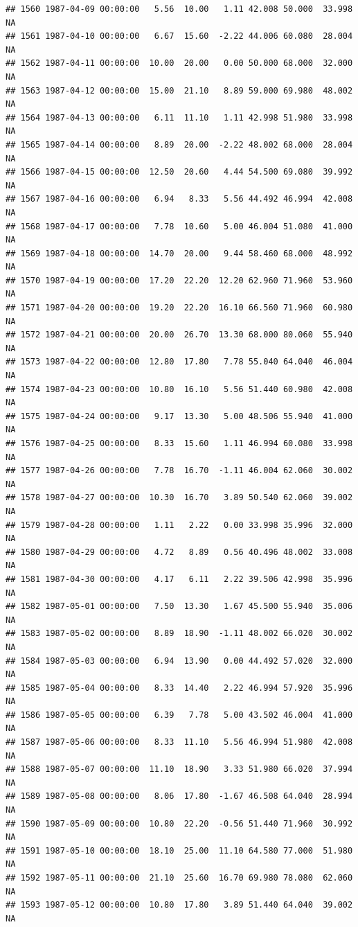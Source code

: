 \documentclass{article}\usepackage{graphicx, color}
\makeatletter
\newenvironment{kframe}{%
 \def\at@end@of@kframe{}%
 \ifinner\ifhmode%
  \def\at@end@of@kframe{\end{minipage}}%
  \begin{minipage}{\columnwidth}%
 \fi\fi%
 \def\FrameCommand##1{\hskip\@totalleftmargin \hskip-\fboxsep
 \colorbox{shadecolor}{##1}\hskip-\fboxsep
     \hskip-\linewidth \hskip-\@totalleftmargin \hskip\columnwidth}%
 \MakeFramed {\advance\hsize-\width
   \@totalleftmargin\z@ \linewidth\hsize
   \@setminipage}}%
 {\par\unskip\endMakeFramed%
 \at@end@of@kframe}
\newenvironment{knitrout}{}{} %
\makeatother
\begin{document}
\begin{knitrout}
\begin{kframe}
\begin{verbatim}
## 1560 1987-04-09 00:00:00   5.56  10.00   1.11 42.008 50.000  33.998     NA
## 1561 1987-04-10 00:00:00   6.67  15.60  -2.22 44.006 60.080  28.004     NA
## 1562 1987-04-11 00:00:00  10.00  20.00   0.00 50.000 68.000  32.000     NA
## 1563 1987-04-12 00:00:00  15.00  21.10   8.89 59.000 69.980  48.002     NA
## 1564 1987-04-13 00:00:00   6.11  11.10   1.11 42.998 51.980  33.998     NA
## 1565 1987-04-14 00:00:00   8.89  20.00  -2.22 48.002 68.000  28.004     NA
## 1566 1987-04-15 00:00:00  12.50  20.60   4.44 54.500 69.080  39.992     NA
## 1567 1987-04-16 00:00:00   6.94   8.33   5.56 44.492 46.994  42.008     NA
## 1568 1987-04-17 00:00:00   7.78  10.60   5.00 46.004 51.080  41.000     NA
## 1569 1987-04-18 00:00:00  14.70  20.00   9.44 58.460 68.000  48.992     NA
## 1570 1987-04-19 00:00:00  17.20  22.20  12.20 62.960 71.960  53.960     NA
## 1571 1987-04-20 00:00:00  19.20  22.20  16.10 66.560 71.960  60.980     NA
## 1572 1987-04-21 00:00:00  20.00  26.70  13.30 68.000 80.060  55.940     NA
## 1573 1987-04-22 00:00:00  12.80  17.80   7.78 55.040 64.040  46.004     NA
## 1574 1987-04-23 00:00:00  10.80  16.10   5.56 51.440 60.980  42.008     NA
## 1575 1987-04-24 00:00:00   9.17  13.30   5.00 48.506 55.940  41.000     NA
## 1576 1987-04-25 00:00:00   8.33  15.60   1.11 46.994 60.080  33.998     NA
## 1577 1987-04-26 00:00:00   7.78  16.70  -1.11 46.004 62.060  30.002     NA
## 1578 1987-04-27 00:00:00  10.30  16.70   3.89 50.540 62.060  39.002     NA
## 1579 1987-04-28 00:00:00   1.11   2.22   0.00 33.998 35.996  32.000     NA
## 1580 1987-04-29 00:00:00   4.72   8.89   0.56 40.496 48.002  33.008     NA
## 1581 1987-04-30 00:00:00   4.17   6.11   2.22 39.506 42.998  35.996     NA
## 1582 1987-05-01 00:00:00   7.50  13.30   1.67 45.500 55.940  35.006     NA
## 1583 1987-05-02 00:00:00   8.89  18.90  -1.11 48.002 66.020  30.002     NA
## 1584 1987-05-03 00:00:00   6.94  13.90   0.00 44.492 57.020  32.000     NA
## 1585 1987-05-04 00:00:00   8.33  14.40   2.22 46.994 57.920  35.996     NA
## 1586 1987-05-05 00:00:00   6.39   7.78   5.00 43.502 46.004  41.000     NA
## 1587 1987-05-06 00:00:00   8.33  11.10   5.56 46.994 51.980  42.008     NA
## 1588 1987-05-07 00:00:00  11.10  18.90   3.33 51.980 66.020  37.994     NA
## 1589 1987-05-08 00:00:00   8.06  17.80  -1.67 46.508 64.040  28.994     NA
## 1590 1987-05-09 00:00:00  10.80  22.20  -0.56 51.440 71.960  30.992     NA
## 1591 1987-05-10 00:00:00  18.10  25.00  11.10 64.580 77.000  51.980     NA
## 1592 1987-05-11 00:00:00  21.10  25.60  16.70 69.980 78.080  62.060     NA
## 1593 1987-05-12 00:00:00  10.80  17.80   3.89 51.440 64.040  39.002     NA

\end{verbatim}
\end{kframe}
\end{knitrout}
\end{document}

